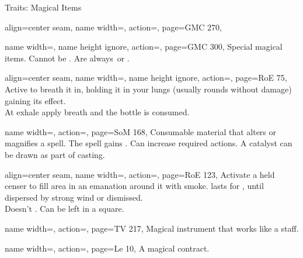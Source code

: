 \begin{PageBack}
\begin{Tables}{\backTableHeight}
\begin{Table}{Traits: Magical Items}
\begin{entry}{}{%
                align=center seam,
                name width=\conditionLength,%
                action=\Apex,
                page=GMC 270,
            }
            \end{entry}
            \begin{entry}{}{%
                name width=\conditionLength,%
                name height ignore,
                action=\Artifact,
                page=GMC 300,
            }
                Special magical items. Cannot be . Are always \Rare\,or \Unique.
            \end{entry}
            \begin{entry}{}{%
                align=center seam,
                name width=\conditionLength,%
                name height ignore,
                action=\BottledBreath,
                page=RoE 75,
            }
                Active to breath it in, holding it in your lungs {(usually \Constitution rounds
                without damage)} gaining its effect. \\At exhale apply breath and the bottle is consumed.
            \end{entry}
            \begin{entry}{}{%
                name width=\conditionLength,%
                action=\Catalyst,
                page=SoM 168,
            }
                Consumable material that alters or magnifies a spell. The spell gains \Manipulate. Can increase
                required actions. A catalyst can be drawn as part of casting.
            \end{entry}
            \begin{entry}{}{%
                align=center seam,
                name width=\conditionLength,%
                action=\Censer,
                page=RoE 123,
            }
                Activate a held censer to fill area in an emanation around it with smoke. lasts for ,
                until dispersed by
                strong wind or dismissed.
                \\ Doesn't . Can be left in a square.
            \end{entry}
            \begin{entry}{}{%
                name width=\conditionLength,%
                action=\Coda,
                page=TV 217,
            }
                Magical instrument that works like a staff.
            \end{entry}
            \begin{entry}{}{%
                name width=\conditionLength,%
                action=\Contract,
                page=Le 10,
            }
                A magical contract.

\end{entry}
\end{Table}
\end{Tables}
\end{PageBack}
